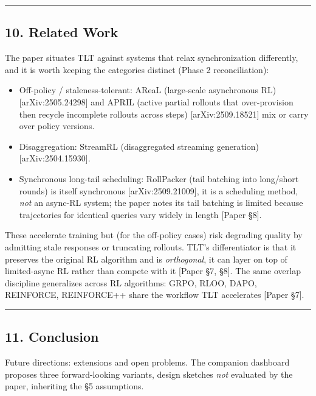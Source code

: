 \documentclass[
  11pt,
  letterpaper,
]{article}
\providecommand{\tightlist}{%
  \setlength{\itemsep}{0pt}\setlength{\parskip}{0pt}}
\begin{document}
\begin{center}\rule{0.5\linewidth}{0.5pt}\end{center}

\subsection{10. Related Work}\label{related-work}

The paper situates TLT against systems that relax synchronization
differently, and it is worth keeping the categories distinct (Phase 2
reconciliation):

\begin{itemize}
\tightlist
\item
  Off-policy / staleness-tolerant: AReaL (large-scale asynchronous RL)
  {[}arXiv:2505.24298{]} and APRIL (active partial rollouts that
  over-provision then recycle incomplete rollouts across steps)
  {[}arXiv:2509.18521{]} mix or carry over policy versions.
\item
  Disaggregation: StreamRL (disaggregated streaming generation)
  {[}arXiv:2504.15930{]}.
\item
  Synchronous long-tail scheduling: RollPacker (tail batching into
  long/short rounds) is itself synchronous {[}arXiv:2509.21009{]}, it is
  a scheduling method, \emph{not} an async-RL system; the paper notes
  its tail batching is limited because trajectories for identical
  queries vary widely in length {[}Paper §8{]}.
\end{itemize}

These accelerate training but (for the off-policy cases) risk degrading
quality by admitting stale responses or truncating rollouts. TLT's
differentiator is that it preserves the original RL algorithm and is
\emph{orthogonal}, it can layer on top of limited-async RL rather than
compete with it {[}Paper §7, §8{]}. The same overlap discipline
generalizes across RL algorithms: GRPO, RLOO, DAPO, REINFORCE,
REINFORCE++ share the workflow TLT accelerates {[}Paper §7{]}.

\begin{center}\rule{0.5\linewidth}{0.5pt}\end{center}

\subsection{11. Conclusion}\label{conclusion}

Future directions: extensions and open problems. The companion dashboard
proposes three forward-looking variants, design sketches \emph{not}
evaluated by the paper, inheriting the §5 assumptions.
\end{document}
